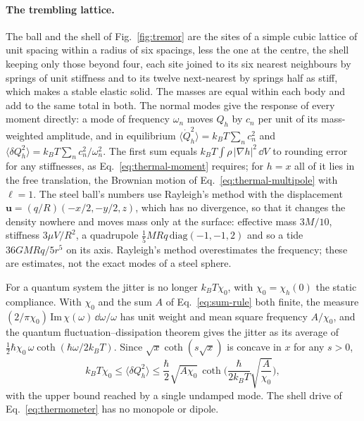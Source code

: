 \paragraph{The trembling lattice.} The ball and the shell of
Fig.~\ref{fig:tremor} are the sites of a simple cubic lattice of unit spacing
within a radius of six spacings, less the one at the centre, the shell keeping
only those beyond four, each
site joined to its six nearest neighbours by springs of unit stiffness and to
its twelve next-nearest by springs half as stiff, which makes a stable elastic
solid. The masses are equal within each body and add to the same total in
both. The normal modes give the response of every moment directly: a mode of
frequency $\omega_n$ moves $Q_h$ by $c_n$ per unit of its mass-weighted
amplitude, and in equilibrium $\langle\dot Q_h^2\rangle = k_BT\sum_n c_n^2$ and
$\langle\delta Q_h^2\rangle = k_BT\sum_n c_n^2/\omega_n^2$. The first sum equals
$k_BT\int\rho\,|\nabla h|^2\,\dd V$ to rounding error for any stiffnesses, as
Eq.~\eqref{eq:thermal-moment} requires; for $h = x$ all of it lies in the free
translation, the Brownian motion of Eq.~\eqref{eq:thermal-multipole} with
$\ell = 1$. The steel ball's numbers use Rayleigh's method with the
displacement $\mathbf{u} = (q/R)(-x/2, -y/2, z)$, which has no divergence, so
that it changes the density nowhere and moves mass only at the surface: effective mass $3M/10$, stiffness $3\mu V/R^2$, a
quadrupole $\tfrac15 MRq\,\mathrm{diag}(-1,-1,2)$ and so a tide
$36GMRq/5r^5$ on its axis. Rayleigh's method overestimates the frequency;
these are estimates, not the exact modes of a steel sphere.

For a quantum system the jitter is no longer $k_BT\chi_0$, with
$\chi_0 = \chi_h(0)$ the static compliance. With $\chi_0$ and the sum $A$ of Eq.~\eqref{eq:sum-rule} both
finite, the measure $(2/\pi\chi_0)\,\mathrm{Im}\,\chi(\omega)\,\dd\omega/\omega$
has unit weight and mean square frequency $A/\chi_0$, and the quantum
fluctuation--dissipation theorem gives the jitter as its average of
$\tfrac12\hbar\chi_0\,\omega\coth(\hbar\omega/2k_BT)$. Since
$\sqrt{x}\coth(s\sqrt{x})$ is concave in $x$ for any $s > 0$,
\begin{equation}\label{eq:jitter-bounds}
k_BT\chi_0 \le \langle\delta Q_h^2\rangle \le
\frac{\hbar}{2}\sqrt{A\chi_0}\,\coth\!\Big(\frac{\hbar}{2k_BT}\sqrt{\frac{A}{\chi_0}}\Big),
\end{equation}
with the upper bound reached by a single undamped mode. The shell drive of
Eq.~\eqref{eq:thermometer} has no monopole or dipole.

